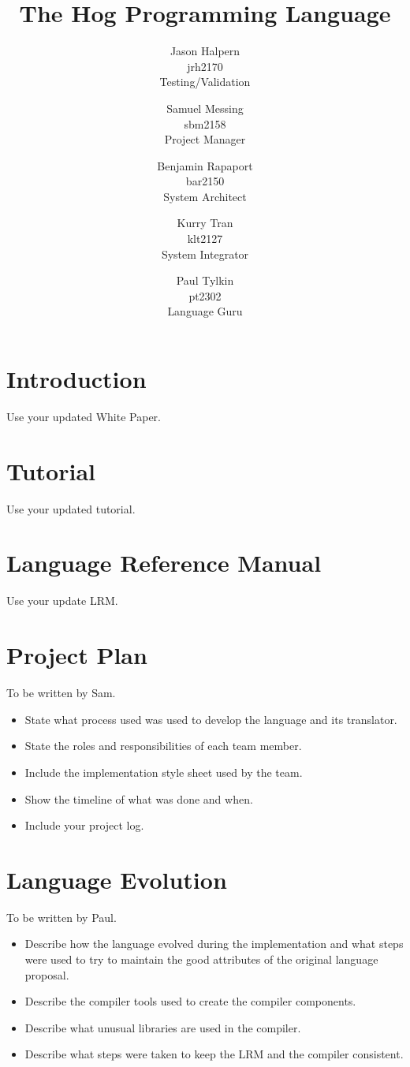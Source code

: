 \documentclass{book}
\title{\huge \textbf{The Hog Programming Language}}
\author{Jason Halpern \\ jrh2170 \\ Testing/Validation
        \and Samuel Messing \\ sbm2158 \\ Project Manager
        \and Benjamin Rapaport \\ bar2150 \\ System Architect
        \and Kurry Tran \\ klt2127 \\ System Integrator
        \and Paul Tylkin \\ pt2302 \\ Language Guru}
\begin{document}
\maketitle

\tableofcontents

\chapter{Introduction}
\label{chap:intro}

Use your updated White Paper.

\chapter{Tutorial}
\label{chap:tutor}

Use your updated tutorial.

\chapter{Language Reference Manual}
\label{chap:LRM}

Use your update LRM.

\chapter{Project Plan}
\label{chap:plan}

To be written by Sam.

\begin{itemize}
\item State what process used was used to develop the language and its translator.
\item State the roles and responsibilities of each team member.
\item Include the implementation style sheet used by the team.
\item Show the timeline of what was done and when.
\item Include your project log.
\end{itemize}

\chapter{Language Evolution}
\label{chap:evo}

To be written by Paul.

\begin{itemize}
\item Describe how the language evolved during the implementation and what steps were used to try to maintain the good attributes of the original language proposal.
\item Describe the compiler tools used to create the compiler components.
\item Describe what unusual libraries are used in the compiler.
\item Describe what steps were taken to keep the LRM and the compiler consistent.
\end{itemize}
\end{document}
